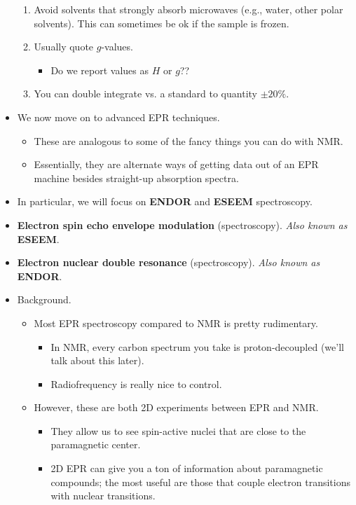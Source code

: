 \documentclass[../notes.tex]{subfiles}
\begin{document}
\begin{itemize}
\begin{enumerate}
        \item Avoid solvents that strongly absorb microwaves (e.g., water, other polar solvents). This can sometimes be ok if the sample is frozen.
        \item Usually quote $g$-values.
        \begin{itemize}
            \item Do we report values as $H$ or $g$??
        \end{itemize}
        \item You can double integrate vs. a standard to quantity $\pm 20\%$.
    \end{enumerate}
    \item We now move on to advanced EPR techniques.
    \begin{itemize}
        \item These are analogous to some of the fancy things you can do with NMR.
        \item Essentially, they are alternate ways of getting data out of an EPR machine besides straight-up absorption spectra.
    \end{itemize}
    \item In particular, we will focus on \textbf{ENDOR} and \textbf{ESEEM} spectroscopy.
    \item \textbf{Electron spin echo envelope modulation} (spectroscopy). \emph{Also known as} \textbf{ESEEM}.
    \item \textbf{Electron nuclear double resonance} (spectroscopy). \emph{Also known as} \textbf{ENDOR}.
    \item Background.
    \begin{itemize}
        \item Most EPR spectroscopy compared to NMR is pretty rudimentary.
        \begin{itemize}
            \item In NMR, every carbon spectrum you take is proton-decoupled (we'll talk about this later).
            \item Radiofrequency is really nice to control.
        \end{itemize}
        \item However, these are both 2D experiments between EPR and NMR.
        \begin{itemize}
            \item They allow us to see spin-active nuclei that are close to the paramagnetic center.
            \item 2D EPR can give you a ton of information about paramagnetic compounds; the most useful are those that couple electron transitions with nuclear transitions.

\end{itemize}
\end{itemize}
\end{itemize}
\end{document}
